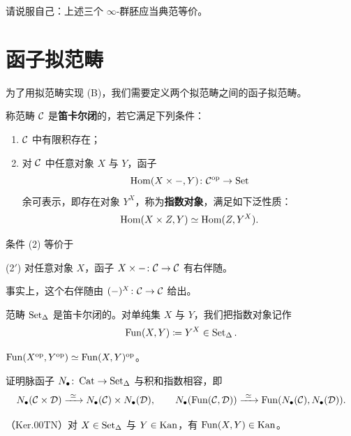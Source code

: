 \begin{exercise}\label{L4-6.3}
请说服自己：上述三个 $\infty$-群胚应当典范等价。
\end{exercise}

\section{函子拟范畴}

\nitem\label{L4-7.1} 为了用拟范畴实现 (B)，我们需要定义两个拟范畴之间的函子拟范畴。

\begin{definition}\label{L4-7.2}
称范畴 $\mathcal{C}$ 是\textbf{笛卡尔闭}的，若它满足下列条件：
\begin{enumerate}[label=(\arabic*),leftmargin=2.4em,itemsep=0.1em]
\item $\mathcal{C}$ 中有限积存在；
\item 对 $\mathcal{C}$ 中任意对象 $X$ 与 $Y$，函子
\[
\operatorname{Hom}(X\times -,Y)\colon \mathcal{C}^{\mathrm{op}}\to\operatorname{Set}
\]
余可表示，即存在对象 $Y^{X}$，称为\textbf{指数对象}，满足如下泛性质：
\[
\operatorname{Hom}(X\times Z,Y)\simeq\operatorname{Hom}(Z,Y^{X}).
\]
\end{enumerate}
\end{definition}

\begin{remark}\label{L4-7.3}
条件 (2) 等价于

(2$'$) 对任意对象 $X$，函子 $X\times -\colon \mathcal{C}\to\mathcal{C}$ 有右伴随。

事实上，这个右伴随由 $(-)^{X}\colon\mathcal{C}\to\mathcal{C}$ 给出。
\end{remark}

\begin{theoremdef}\label{L4-7.4}
范畴 $\operatorname{Set}_\Delta$ 是笛卡尔闭的。对单纯集 $X$ 与 $Y$，我们把指数对象记作
\[
\operatorname{Fun}(X,Y)\coloneqq Y^{X}\in\operatorname{Set}_\Delta.
\]
\end{theoremdef}

\begin{exercise}\label{L4-7.5}
$\operatorname{Fun}(X^{\mathrm{op}},Y^{\mathrm{op}})\simeq\operatorname{Fun}(X,Y)^{\mathrm{op}}$。
\end{exercise}

\begin{exercise}\label{L4-7.6}
证明脉函子 $N_{\bullet}\colon\operatorname{Cat}\to\operatorname{Set}_\Delta$ 与积和指数相容，即
\[
N_{\bullet}(\cC\times\cD)\xrightarrow{\ \simeq\ }N_{\bullet}(\cC)\times N_{\bullet}(\cD),
\qquad
N_{\bullet}(\Fun(\cC,\cD))\xrightarrow{\ \simeq\ }\Fun(N_{\bullet}(\cC),N_{\bullet}(\cD)).
\]
\end{exercise}

\begin{proposition}\label{L4-7.7}
（Ker.00TN）对 $X\in\operatorname{Set}_\Delta$ 与 $Y\in\operatorname{Kan}$，有 $\operatorname{Fun}(X,Y)\in\operatorname{Kan}$。
\end{proposition}

